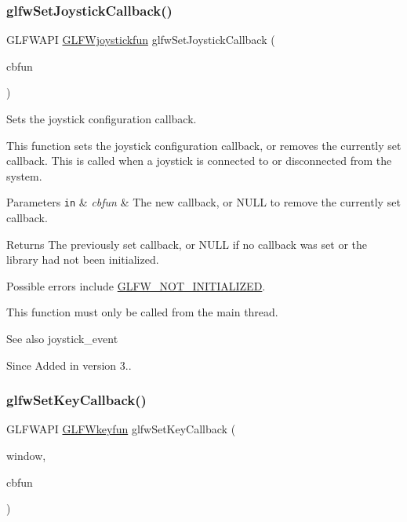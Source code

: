 \subsubsection{\texorpdfstring{glfw\+Set\+Joystick\+Callback()}{glfwSetJoystickCallback()}}
{\footnotesize\ttfamily G\+L\+F\+W\+A\+PI \hyperlink{group__input_gaa67aa597e974298c748bfe4fb17d406d}{G\+L\+F\+Wjoystickfun} glfw\+Set\+Joystick\+Callback (\begin{DoxyParamCaption}\item[{\hyperlink{group__input_gaa67aa597e974298c748bfe4fb17d406d}{G\+L\+F\+Wjoystickfun}}]{cbfun }\end{DoxyParamCaption})}



Sets the joystick configuration callback. 

This function sets the joystick configuration callback, or removes the currently set callback. This is called when a joystick is connected to or disconnected from the system.


\begin{DoxyParams}[1]{Parameters}
\mbox{\tt in}  & {\em cbfun} & The new callback, or {\ttfamily N\+U\+LL} to remove the currently set callback. \\
\hline
\end{DoxyParams}
\begin{DoxyReturn}{Returns}
The previously set callback, or {\ttfamily N\+U\+LL} if no callback was set or the library had not been initialized.
\end{DoxyReturn}
Possible errors include \hyperlink{group__errors_ga2374ee02c177f12e1fa76ff3ed15e14a}{G\+L\+F\+W\+\_\+\+N\+O\+T\+\_\+\+I\+N\+I\+T\+I\+A\+L\+I\+Z\+ED}.

This function must only be called from the main thread.

\begin{DoxySeeAlso}{See also}
joystick\+\_\+event
\end{DoxySeeAlso}
\begin{DoxySince}{Since}
Added in version 3.. 
\end{DoxySince}
\mbox{\label{group__input_gaa73bb92f628a2a0be9c132d56f19362c}} 
\subsubsection{\texorpdfstring{glfw\+Set\+Key\+Callback()}{glfwSetKeyCallback()}}
{\footnotesize\ttfamily G\+L\+F\+W\+A\+PI \hyperlink{group__input_ga0192a232a41e4e82948217c8ba94fdfd}{G\+L\+F\+Wkeyfun} glfw\+Set\+Key\+Callback (\begin{DoxyParamCaption}\item[{\hyperlink{group__window_ga3c96d80d363e67d13a41b5d1821f3242}{G\+L\+F\+Wwindow} $\ast$}]{window,  }\item[{\hyperlink{group__input_ga0192a232a41e4e82948217c8ba94fdfd}{G\+L\+F\+Wkeyfun}}]{cbfun }\end{DoxyParamCaption})}



